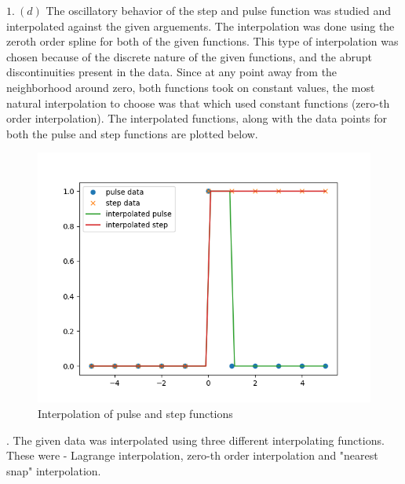 \documentclass[12pt]{article}
\begin{document}
\newpage
\indent $1. \ (d)$ The oscillatory behavior of the step and pulse function was studied and interpolated against the given arguements. The interpolation was done using the zeroth order spline for both of the given functions. This type of interpolation was chosen because of the discrete nature of the given functions, and the abrupt discontinuities present in the data. Since at any point away from the neighborhood around zero, both functions took on constant values, the most natural interpolation to choose was that which used constant functions (zero-th order interpolation). The interpolated functions, along with the data points for both the pulse and step functions are plotted below. 
\begin{figure}[h]
	\centering
	\includegraphics[scale=0.75]{1d.png}
	\caption{Interpolation of pulse and step functions}
\end{figure}

. The given data was interpolated using three different interpolating functions. These were - Lagrange interpolation, zero-th order interpolation and "nearest snap" interpolation. \\
\end{document}

